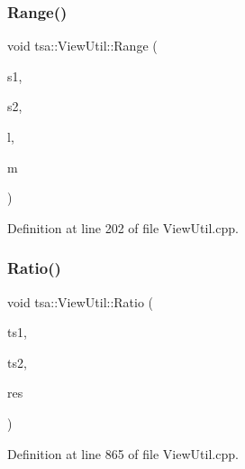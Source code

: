 \subsubsection{\texorpdfstring{Range()}{Range()}\hspace{0.1cm}{\footnotesize\ttfamily [3/3]}}
{\footnotesize\ttfamily void tsa\+::\+View\+Util\+::\+Range (\begin{DoxyParamCaption}\item[{\hyperlink{namespacetsa_ac599574bcc094eda25613724b8f3ca9e}{Seq\+View\+Double} \&}]{s1,  }\item[{\hyperlink{namespacetsa_ac599574bcc094eda25613724b8f3ca9e}{Seq\+View\+Double} \&}]{s2,  }\item[{int}]{l,  }\item[{int}]{m }\end{DoxyParamCaption})\hspace{0.3cm}{\ttfamily [static]}}



Definition at line 202 of file View\+Util.\+cpp.

\mbox{\label{classtsa_1_1_view_util_a7472defdb289abc1904d985e284d51a7}} 
\subsubsection{\texorpdfstring{Ratio()}{Ratio()}\hspace{0.1cm}{\footnotesize\ttfamily [1/4]}}
{\footnotesize\ttfamily void tsa\+::\+View\+Util\+::\+Ratio (\begin{DoxyParamCaption}\item[{\hyperlink{namespacetsa_ac599574bcc094eda25613724b8f3ca9e}{Seq\+View\+Double} \&}]{ts1,  }\item[{\hyperlink{namespacetsa_ac599574bcc094eda25613724b8f3ca9e}{Seq\+View\+Double} \&}]{ts2,  }\item[{\hyperlink{namespacetsa_ac599574bcc094eda25613724b8f3ca9e}{Seq\+View\+Double} \&}]{res }\end{DoxyParamCaption})\hspace{0.3cm}{\ttfamily [static]}}



Definition at line 865 of file View\+Util.\+cpp.

\mbox{\label{classtsa_1_1_view_util_a64ba1355162435b8ac44936c5957f2b8}} 
